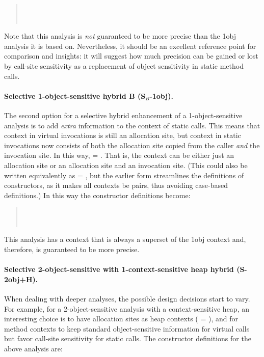 \begin{quote}
 \\
 \\
\end{quote}

Note that this analysis is \emph{not} guaranteed to be more precise than the 1obj analysis it is based on. Nevertheless, it should be an excellent reference point for comparison and insights: it will suggest how much precision can be gained or lost by call-site sensitivity as a replacement of object sensitivity in static method calls.

\paragraph[Selective 1-object-sensitive (-B)]{Selective 1-object-sensitive hybrid B (S$_B$-1obj).}
The second option for a selective hybrid enhancement of a 1-object-sensitive analysis is to add \emph{extra} information to the context of static calls. This means that context in virtual invocations is still an allocation site, but context in static invocations now consists of both the allocation site copied from the caller \emph{and} the invocation site. In this way,  = . That is, the context can be either just an allocation site or an allocation site and an invocation site. (This could also be written equivalently as  = , but the earlier form streamlines the definitions of constructors, as it makes all contexts be pairs, thus avoiding case-based definitions.)  In this way the constructor definitions become:

\begin{quote}
 \\
 \\
\end{quote}

This analysis has a context that is always a superset of the 1obj context and, therefore, is guaranteed to be more precise.

\paragraph[Selective 2-object-sensitive with 1-context-sensitive heap]{Selective 2-object-sensitive with 1-context-sensitive heap hybrid (S-2obj+H).}
When dealing with deeper analyses, the possible design decisions start to vary. For example, for a 2-object-sensitive analysis with a context-sensitive heap, an interesting choice is to have allocation sites as heap contexts ( = ), and for method contexts to keep standard object-sensitive information for virtual calls but favor call-site sensitivity for static calls. The constructor definitions for the above analysis are:

